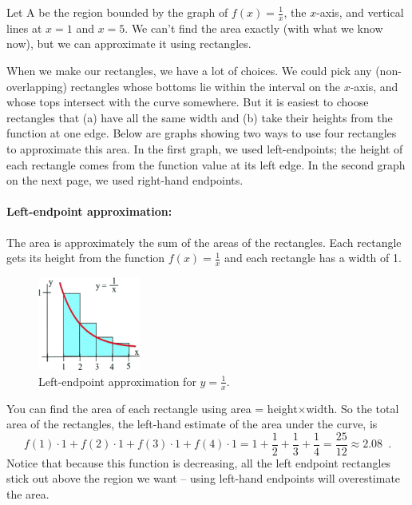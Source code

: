 \begin{example}
Let A be the region bounded by the graph of $f(x)=\frac{1}{x}$, the $x$-axis, and vertical lines at $x=1$ and $x=5$. We can’t find the area exactly (with what we know now), but we can approximate it using rectangles.

\begin{solution}
When we make our rectangles, we have a lot of choices. We could pick any (non-overlapping) rectangles whose bottoms lie within the interval on the $x$-axis, and whose tops intersect with the curve somewhere. But it is easiest to choose rectangles that (a) have all the same width and (b) take their heights from the function at one edge. Below are graphs showing two ways to use four rectangles to approximate this area. In the first graph, we used left-endpoints; the height of each rectangle comes from the function value at its left edge. In the second graph on the next page, we used right-hand endpoints.

\paragraph{Left-endpoint approximation:} The area is approximately the sum of the areas of the rectangles. Each rectangle gets its height from the function $f(x)=\frac{1}{x}$ and each rectangle has a width of 1.

\begin{figure}[!ht]
  \centering
    \includegraphics[width=0.3\textwidth]{img/chap5/image008.png}
    \caption{Left-endpoint approximation for $y=\frac{1}{x}$.}
    \label{fig:5-2-leftex}
\end{figure}
You can find the area of each rectangle using area = height$\times$width. So the total area of the rectangles, the left-hand estimate of the area under the curve, is
$$f(1) \cdot 1 + f(2) \cdot 1 + f(3) \cdot 1 + f(4) \cdot 1 = 1 + \frac{1}{2} + \frac{1}{3} + \frac{1}{4} = \frac{25}{12}\approx   2.08 \enspace .$$
Notice that because this function is decreasing, all the left endpoint rectangles stick out above the region we want -- using left-hand endpoints will overestimate the area.


\end{solution}
\end{example}
